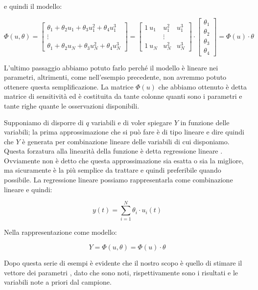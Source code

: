 \begin{esempio}
e quindi il modello:

  \[ \Phi(u,\theta)=\begin{bmatrix} \theta_1 + \theta_2u_1+\theta_3u_1^2+\theta_4u_1^3  \\ \vdots \\ \theta_1 + \theta_2u_N+\theta_3u_N^2+\theta_4u_N^3 \end{bmatrix} =\begin{bmatrix} 1 \ u_1 & u_1^2 & u_1^3 \\ & \vdots &    \\  1\ u_N & u_N^2 & u_N^3 \end{bmatrix}\cdot \begin{bmatrix} \theta_1 \\ \theta_2 \\ \theta_3 \\ \theta_4 \end{bmatrix} = \Phi(u) \cdot \theta \]
  
L'ultimo passaggio abbiamo potuto farlo perché il modello è lineare nei parametri, altrimenti, come nell'esempio precedente, non avremmo potuto ottenere questa semplificazione. La matrice $\Phi(u)$ che abbiamo ottenuto è detta matrice di sensitività  ed è costituita da tante colonne quanti sono i parametri e tante righe quante le osservazioni disponibili.
\end{esempio}

\begin{esempio} %
Supponiamo di disporre di $q$ variabili e di voler spiegare $Y$ in funzione delle variabili; la prima approssimazione che si può fare è di tipo lineare e dire quindi che $Y$ è generata per combinazione lineare delle variabili di cui disponiamo. Questa forzatura alla linearità della funzione è detta regressione lineare . Ovviamente non è detto che questa approssimazione sia esatta o sia la migliore, ma sicuramente è la più semplice da trattare e quindi preferibile quando possibile. La regressione lineare possiamo rappresentarla come combinazione lineare e quindi:

  \[ y(t)=\sum_{i=1}^{N} {\theta_i \cdot u_i(t)} \]
  
Nella rappresentazione come modello:

  \[ Y=\Phi(u,\theta)=\Phi(u) \cdot \theta \]
\end{esempio}

Dopo questa serie di esempi è evidente che il nostro scopo è quello di stimare il vettore dei parametri , dato che sono noti, rispettivamente sono i risultati e le variabili note a priori dal campione.
